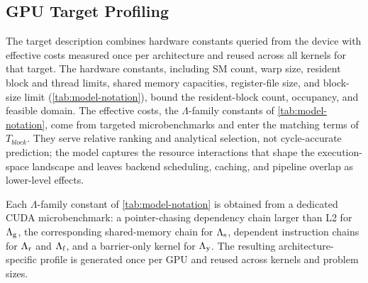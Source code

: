 \subsection{GPU Target Profiling}
\label{sec:gpu-target-profiling}

The target description combines hardware constants queried from the device with effective costs measured once per architecture and reused across all kernels for that target. The hardware constants, including SM count, warp size, resident block and thread limits, shared memory capacities, register-file size, and block-size limit (\autoref{tab:model-notation}), bound the resident-block count, occupancy, and feasible domain. The effective costs, the \(\Lambda\)-family constants of \autoref{tab:model-notation}, come from targeted microbenchmarks and enter the matching terms of \(T_{\mathit{block}}\). They serve relative ranking and analytical selection, not cycle-accurate prediction; the model captures the resource interactions that shape the execution-space landscape and leaves backend scheduling, caching, and pipeline overlap as lower-level effects.

Each \(\Lambda\)-family constant of \autoref{tab:model-notation} is obtained from a dedicated CUDA microbenchmark: a pointer-chasing dependency chain larger than L2 for \(\Lambda_{\mathrm g}\), the corresponding shared-memory chain for \(\Lambda_{\mathrm s}\), dependent instruction chains for \(\Lambda_{\mathrm r}\) and \(\Lambda_{\mathrm f}\), and a barrier-only kernel for \(\Lambda_{\mathrm y}\). The resulting architecture-specific profile is generated once per GPU and reused across kernels and problem sizes.
